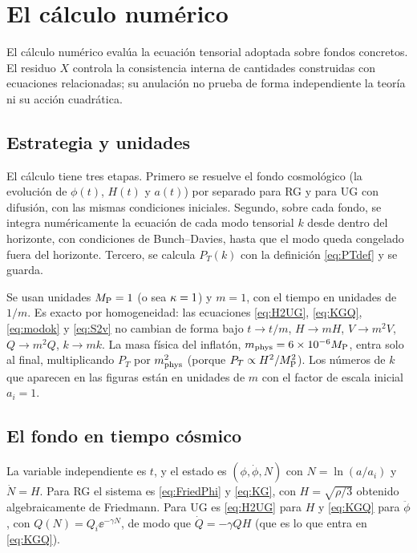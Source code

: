 \section{El cálculo numérico}
\label{sec:numerico}

El cálculo numérico evalúa la ecuación tensorial adoptada sobre fondos concretos. El residuo $X$ controla la consistencia interna de cantidades construidas con ecuaciones relacionadas; su anulación no prueba de forma independiente la teoría ni su acción cuadrática.
\subsection{Estrategia y unidades}

El cálculo tiene tres etapas. Primero se resuelve el fondo cosmológico (la evolución de $\phi(t)$, $H(t)$ y $a(t)$) por separado para RG y para UG con difusión, con las mismas condiciones iniciales. Segundo, sobre cada fondo, se integra numéricamente la ecuación de cada modo tensorial $k$ desde dentro del horizonte, con condiciones de Bunch--Davies, hasta que el modo queda congelado fuera del horizonte. Tercero, se calcula $P_T(k)$ con la definición \eqref{eq:PTdef} y se guarda.

Se usan unidades $M_{\rm P}=1$ (o sea $\kappa=1$) y $m=1$, con el tiempo en unidades de $1/m$. Es exacto por homogeneidad: las ecuaciones \eqref{eq:H2UG}, \eqref{eq:KGQ}, \eqref{eq:modok} y \eqref{eq:S2v} no cambian de forma bajo $t\to t/m$, $H\to mH$, $V\to m^2V$, $Q\to m^2Q$, $k\to mk$. La masa física del inflatón, $m_{\rm phys}=6\times10^{-6}M_{\rm P}$, entra solo al final, multiplicando $P_T$ por $m_{\rm phys}^2$ (porque $P_T\propto H^2/M_{\rm P}^2$). Los números de $k$ que aparecen en las figuras están en unidades de $m$ con el factor de escala inicial $a_i=1$.

\subsection{El fondo en tiempo cósmico}

La variable independiente es $t$, y el estado es $(\phi,\dot\phi,N)$ con $N=\ln(a/a_i)$ y $\dot N=H$. Para RG el sistema es \eqref{eq:FriedPhi} y \eqref{eq:KG}, con $H=\sqrt{\rho/3}$ obtenido algebraicamente de Friedmann. Para UG es \eqref{eq:H2UG} para $H$ y \eqref{eq:KGQ} para $\ddot\phi$, con $Q(N)=Q_i\ee^{-\gamma N}$, de modo que $\dot Q=-\gamma QH$ (que es lo que entra en \eqref{eq:KGQ}).

